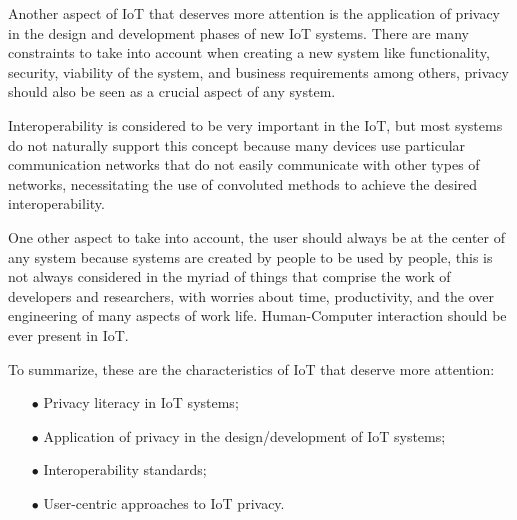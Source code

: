 Another aspect of IoT that deserves more attention
is the application of privacy in the design and development phases of new
IoT systems. There are many constraints to take into account when creating a
new system like functionality, security, viability of the system, and business
requirements among others, privacy should also be seen as a crucial aspect
of any system.

Interoperability is considered to be very important in the IoT,
but most systems do not naturally support this concept because many devices use particular
communication networks that do not easily communicate with other types of networks,
necessitating the use of convoluted methods to achieve the desired interoperability.

One other aspect to take into account, the user should always be at the center
of any system because systems are created by people to be used by people, this is not
always considered in the myriad of things that comprise the work of developers
and researchers, with worries about time, productivity, and the over
engineering of many aspects of work life. Human-Computer interaction should
be ever present in IoT.

To summarize, these are the characteristics of IoT that deserve more attention:

\begin{itemize}
    \item[$\bullet$]
    Privacy literacy in IoT systems;
    \item[$\bullet$]
    Application of privacy in the design/development of IoT systems;
    \item[$\bullet$]
    Interoperability standards;
    \item[$\bullet$]
    User-centric approaches to IoT privacy.
\end{itemize}
